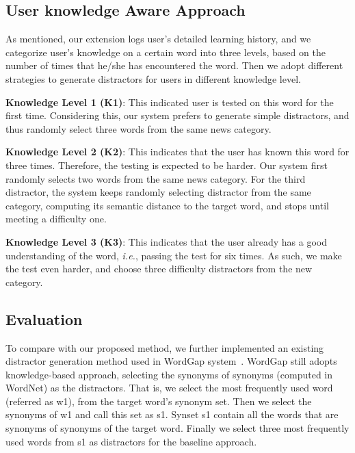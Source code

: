 \subsection{User knowledge Aware Approach}
As mentioned, our extension logs user's detailed learning history, and we categorize user's knowledge  on a certain word into three levels, based on the number of times that he/she has encountered  the word.  Then we adopt different strategies to generate  distractors for users in different knowledge level. 


{\bf Knowledge Level 1 (K1)}: This indicated user is tested on this word for the first time. Considering this, our system prefers to generate simple distractors, and thus randomly select three words from the same news category. 

{\bf Knowledge Level 2 (K2)}: This indicates that the user has known this word for three times. Therefore, the testing is expected to be harder. Our system first randomly selects two words from the same news category. For the third distractor,  the system keeps randomly selecting distractor from the same category, computing its semantic distance to the target word, and stops until meeting a difficulty one.


{\bf Knowledge Level 3 (K3)}: This indicates that the user already has a good understanding of the word, {\it i.e.}, passing the test for six times. As such, we make the test even harder, and choose  three difficulty distractors from the new category. 



\subsection{Evaluation}
To compare with our proposed method, we further implemented an existing distractor generation method  used in WordGap system~\cite{Knoop2013}. WordGap still adopts knowledge-based approach, selecting the synonyms of synonyms (computed in WordNet) as the distractors. That is, we select the most frequently used word (referred as w1), from the target word’s synonym set. %
Then we select the synonyms of w1 and call this set as s1.
Synset s1 contain all the words that are synonyms of synonyms of the target word. Finally we select three most frequently used words from s1 as distractors for the baseline approach.

